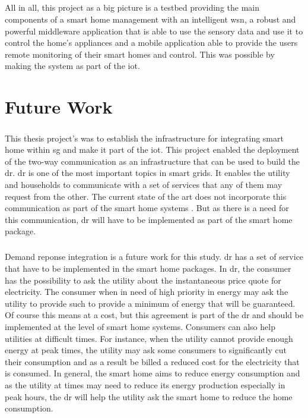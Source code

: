 \documentclass[oneside,12pt,a4paper,final]{book}
\begin{document}
\paragraph{}
All in all, this project as a big picture is a testbed providing the main components of a smart home management with an intelligent \gls{wsn}, a robust and powerful middleware application that is able to use the sensory data and use it to control the home's appliances and a mobile application able to provide the users remote monitoring of their smart homes and control. This was possible by making the system as part of the \gls{iot}.
\chapter{Future Work}
\paragraph{}
This thesis project's was to establish the infrastructure for integrating smart home within \gls{sg} and make it part of the \gls{iot}. This project enabled the deployment of the two-way communication as an infrastructure that can be used to build the \gls{dr}. \gls{dr} is one of the most important topics in smart grids. It enables the utility and households to communicate with a set of services that any of them may request from the other. The current state of the art does not incorporate this communication as part of the smart home systems \cite{ref15}. But as there is a need for this communication, \gls{dr} will have to be implemented as part of the smart home package.
\paragraph{}
Demand reponse integration is a future work for this study. \gls{dr} has a set of service that have to be implemented in the smart home packages. In \gls{dr}, the consumer has the possibility to ask the utility about the instantaneous price quote for electricity. The consumer when in need of high priority in energy may ask the utility to provide such to provide a minimum of energy that will be guaranteed. Of course this means at a cost, but this agreement is part of the \gls{dr} and should be implemented at the level of smart home systems. Consumers can also help utilities at difficult times. For instance, when the utility cannot provide enough energy at peak times, the utility may ask some consumers to significantly cut their consumption and as a result be billed a reduced cost for the electricity that is consumed. In general, the smart home aims to reduce energy consumption and as the utility at times may need to reduce its energy production especially in peak hours, the \gls{dr} will help the utility ask the smart home to reduce the home consumption.
\end{document}
